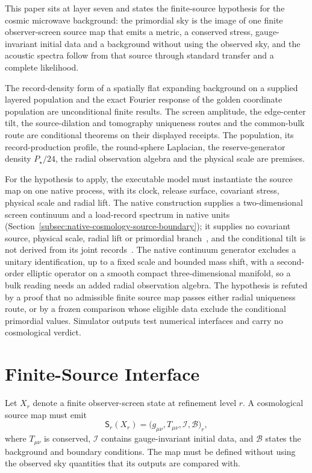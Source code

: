\documentclass[11pt]{article}
\theoremstyle{remark}
\begin{document}
This paper sits at layer seven and states the finite-source hypothesis for
the cosmic microwave background: the primordial sky is the image of one
finite observer-screen source map that emits a metric, a conserved stress,
gauge-invariant initial data and a background without using the observed
sky, and the acoustic spectra follow from that source through standard
transfer and a complete likelihood.

The record-density form of a spatially flat expanding background on a
supplied layered population and the exact Fourier response of the golden
coordinate population are unconditional finite results. The screen
amplitude, the edge-center tilt, the source-dilation and tomography
uniqueness routes and the common-bulk route are conditional theorems on
their displayed receipts. The population, its record-production profile,
the round-sphere Laplacian, the reserve-generator density \(P_\star/24\),
the radial observation algebra and the physical scale are premises.

For the hypothesis to apply, the executable model must instantiate the
source map on one native process, with its clock, release surface,
covariant stress, physical scale and radial lift. The native construction
supplies a two-dimensional screen continuum and a load-record spectrum in
native units (Section~\ref{subsec:native-cosmology-source-boundary}); it
supplies no covariant source, physical scale, radial lift or primordial
branch~\cite{ophmodel,ophtimefields}, and the conditional tilt is not derived
from its joint records~\cite{ophpublicdata}. The native continuum generator
excludes a unitary identification, up to a fixed scale and bounded mass
shift, with a second-order elliptic operator on a smooth compact
three-dimensional manifold, so a bulk reading needs an added
radial observation algebra. The hypothesis is refuted by a proof that no
admissible finite source map passes either radial uniqueness route, or by a
frozen comparison whose eligible data exclude the conditional primordial
values. Simulator outputs test numerical interfaces and carry no
cosmological verdict.

\section{Finite-Source Interface}

Let \(X_r\) denote a finite observer-screen state at refinement level \(r\).
A cosmological source map must emit
\begin{equation}
\mathsf S_r(X_r)
=\bigl(g_{\mu\nu},T_{\mu\nu},\mathcal I,\mathcal B\bigr)_r,
\label{eq:source-map}
\end{equation}
where \(T_{\mu\nu}\) is conserved, \(\mathcal I\) contains gauge-invariant
initial data, and \(\mathcal B\) states the background and boundary conditions.
The map must be defined without using the observed sky quantities that its
outputs are compared with.
\end{document}
